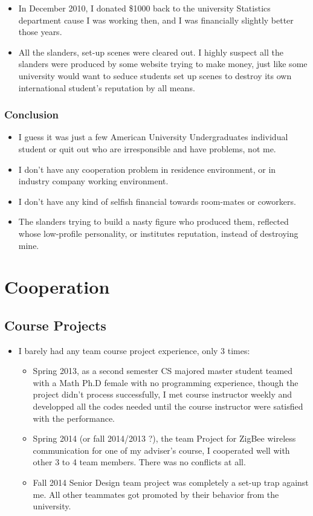 \documentclass[9pt,b5paper]{article}
\begin{document}
\begin{enumerate}
\begin{itemize}
\begin{itemize}
\item In December 2010, I donated \$1000 back to the university Statistics department cause I was working then, and I was financially slightly better those years.
\item All the slanders, set-up scenes were cleared out. I highly suspect all the slanders were produced by some website trying to make money, just like some university would want to seduce students set up scenes to destroy its own international student's reputation by all means.
\end{itemize}
\end{itemize}
\end{enumerate}

\subsubsection{Conclusion}
\label{sec-2-4-3}
\begin{itemize}
\item I guess it was just a few American University Undergraduates individual student or quit out who are irresponsible and have problems, not me.
\item I don't have any cooperation problem in residence environment, or in industry company working environment.
\item I don't have any kind of selfish financial towards room-mates or coworkers.
\item The slanders trying to build a nasty figure who produced them, reflected whose low-profile personality, or institutes reputation, instead of destroying mine.
\end{itemize}

\section{Cooperation}
\label{sec-3}
\subsection{Course Projects}
\label{sec-3-1}
\begin{itemize}
\item I barely had any team course project experience, only 3 times:
\begin{itemize}
\item Spring 2013, as a second semester CS majored master student teamed with a Math Ph.D female with no programming experience, though the project didn't process successfully, I met course instructor weekly and developped all the codes needed until the course instructor were satisfied with the performance.
\item Spring 2014 (or fall 2014/2013 ?), the team Project for ZigBee wireless communication for one of my adviser's course, I cooperated well with other 3 to 4 team members. There was no conflicts at all.
\item Fall 2014 Senior Design team project was completely a set-up trap against me. All other teammates got promoted by their behavior from the university.
\end{itemize}
\end{itemize}
\end{document}
